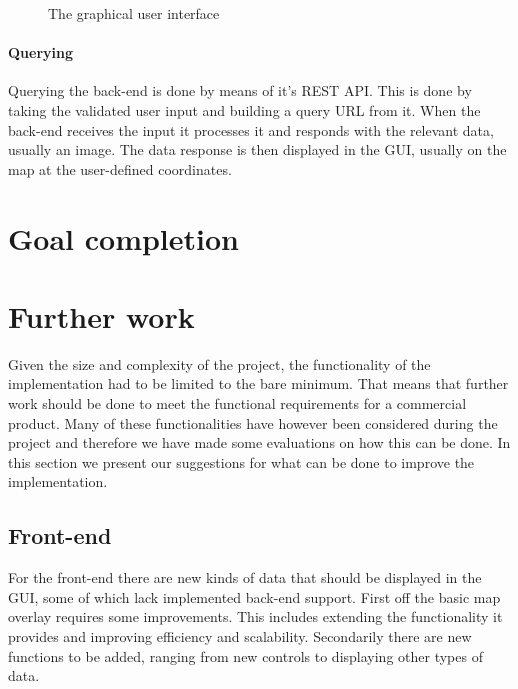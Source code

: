 \documentclass[11pt,a4paper,titlepage,oneside]{report}
\begin{document}
\begin{figure}[!htb]
\begin{center}
\caption{The graphical user interface}
\label{fig:gui}
\end{center}
\end{figure}

\paragraph{Querying}
Querying the \gls{back-end} is done by means of it's REST \gls{API}. This is done by taking the validated user input and building a query \gls{URL} from it. When the \gls{back-end} receives the input it processes it and responds with the relevant data, usually an image. The data response is then displayed in the \gls{GUI}, usually on the map at the user-defined coordinates. 


\section{Goal completion}
\section{Further work}
Given the size and complexity of the project, the functionality of the implementation had to be limited to the bare minimum. That means that further work should be done to meet the functional requirements for a commercial product. Many of these functionalities have however been considered during the project and therefore we have made some evaluations on how this can be done. In this section we present our suggestions for what can be done to improve the implementation.

\subsection{Front-end}
For the front-end there are new kinds of data that should be displayed in the \gls{GUI}, some of which lack implemented \gls{back-end} support. First off the basic map overlay requires some improvements. This includes extending the functionality it provides and improving efficiency and scalability. Secondarily there are new functions to be added, ranging from new controls to displaying other types of data.
\end{document}
